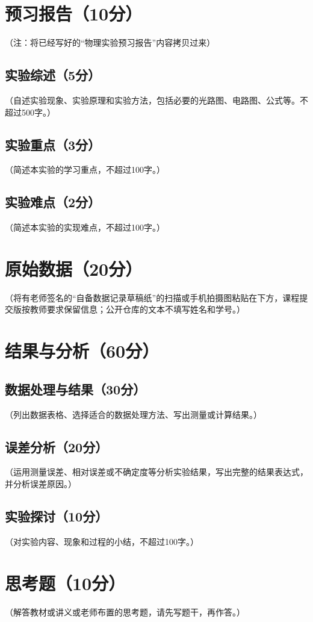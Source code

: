 \documentclass[]{../../templates/Report}%
\begin{document}
\maketitle%

\section{预习报告（10分）}
（注：将已经写好的“物理实验预习报告”内容拷贝过来）

\subsection{实验综述（5分）}
（自述实验现象、实验原理和实验方法，包括必要的光路图、电路图、公式等。不超过500字。）

\subsection{实验重点（3分）}
（简述本实验的学习重点，不超过100字。）

\subsection{实验难点（2分）}
（简述本实验的实现难点，不超过100字。）

\begin{fullreportonly}
\section{原始数据（20分）}
（将有老师签名的“自备数据记录草稿纸”的扫描或手机拍摄图粘贴在下方，课程提交版按教师要求保留信息；公开仓库的文本不填写姓名和学号。）

\section{结果与分析（60分）}
\subsection{数据处理与结果（30分）}
（列出数据表格、选择适合的数据处理方法、写出测量或计算结果。）

\subsection{误差分析（20分）}
（运用测量误差、相对误差或不确定度等分析实验结果，写出完整的结果表达式，并分析误差原因。）

\subsection{实验探讨（10分）}
（对实验内容、现象和过程的小结，不超过100字。）

\section{思考题（10分）}
（解答教材或讲义或老师布置的思考题，请先写题干，再作答。）
\end{fullreportonly}
\insertnotes
\end{document}
